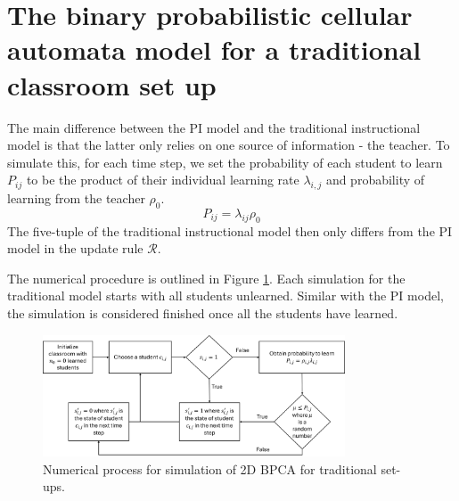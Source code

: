 \section{The binary probabilistic cellular automata model for a traditional classroom set up}
The main difference between the PI model and the traditional instructional model is that the latter only relies on one source of information - the teacher. To simulate this, for each time step, we set the probability of each student to learn $P_{ij}$ to be the product of their individual learning rate $\lambda_{i,j}$ and probability of learning from the teacher $\rho_{0}$. 
\begin{equation}
    \label{eq:BPCA traditional learning probability}
        P_{ij} = \lambda_{ij} \rho_{0}
\end{equation}
The five-tuple of the traditional instructional model then only differs from the PI model in the update rule $\mathcal{R}$.

The numerical procedure is outlined in Figure \ref{fig:2DBPCA Traditional Flowchart}. Each simulation for the traditional model starts with all students unlearned. Similar with the PI model, the simulation is considered finished once all the students have learned.

\begin{figure}[h!]
    \centering
    \includegraphics[width=0.8\textwidth]{figures/2DBPCA TI Flowchart.png}
    \caption[Traditional instruction flowchart]{Numerical process for simulation of 2D BPCA for traditional set-ups.}
    \label{fig:2DBPCA Traditional Flowchart}
\end{figure}

